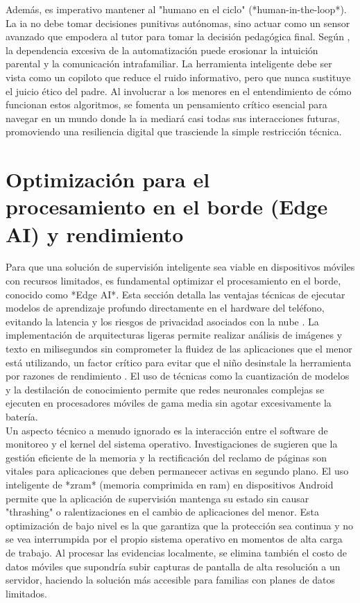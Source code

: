 Además, es imperativo mantener al "humano en el ciclo" (*human-in-the-loop*). La \gls{ia} no debe tomar decisiones punitivas autónomas, sino actuar como un sensor avanzado que empodera al tutor para tomar la decisión pedagógica final. Según \cite{agbana_ethical_2025}, la dependencia excesiva de la automatización puede erosionar la intuición parental y la comunicación intrafamiliar. La herramienta inteligente debe ser vista como un copiloto que reduce el ruido informativo, pero que nunca sustituye el juicio ético del padre. Al involucrar a los menores en el entendimiento de cómo funcionan estos algoritmos, se fomenta un pensamiento crítico esencial para navegar en un mundo donde la \gls{ia} mediará casi todas sus interacciones futuras, promoviendo una resiliencia digital que trasciende la simple restricción técnica.\\

\section{Optimización para el procesamiento en el borde (Edge AI) y rendimiento}

Para que una solución de supervisión inteligente sea viable en dispositivos móviles con recursos limitados, es fundamental optimizar el procesamiento en el borde, conocido como *Edge AI*. Esta sección detalla las ventajas técnicas de ejecutar modelos de aprendizaje profundo directamente en el hardware del teléfono, evitando la latencia y los riesgos de privacidad asociados con la nube \cite{sahu_edge_2025}. La implementación de arquitecturas ligeras permite realizar análisis de imágenes y texto en milisegundos sin comprometer la fluidez de las aplicaciones que el menor está utilizando, un factor crítico para evitar que el niño desinstale la herramienta por razones de rendimiento \cite{ali_efficient_2021}. El uso de técnicas como la cuantización de modelos y la destilación de conocimiento permite que redes neuronales complejas se ejecuten en procesadores móviles de gama media sin agotar excesivamente la batería.\\

Un aspecto técnico a menudo ignorado es la interacción entre el software de monitoreo y el kernel del sistema operativo. Investigaciones de \cite{cao_mobile_2023} sugieren que la gestión eficiente de la memoria y la rectificación del reclamo de páginas son vitales para aplicaciones que deben permanecer activas en segundo plano. El uso inteligente de *zram* (memoria comprimida en \gls{ram}) en dispositivos Android permite que la aplicación de supervisión mantenga su estado sin causar "thrashing" o ralentizaciones en el cambio de aplicaciones del menor. Esta optimización de bajo nivel es la que garantiza que la protección sea continua y no se vea interrumpida por el propio sistema operativo en momentos de alta carga de trabajo. Al procesar las evidencias localmente, se elimina también el costo de datos móviles que supondría subir capturas de pantalla de alta resolución a un servidor, haciendo la solución más accesible para familias con planes de datos limitados.\\


